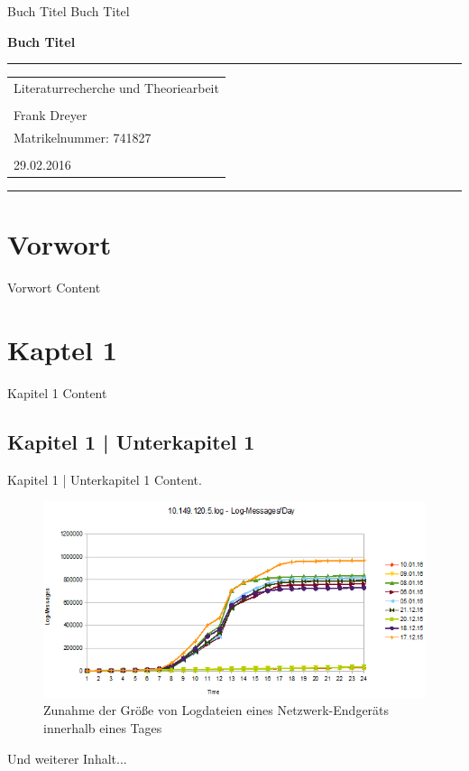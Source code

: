 \documentclass[deutsch]{lib/llncs/llncs}
\begin{document}
\markboth
{Buch Titel}
{Buch Titel}
\thispagestyle{empty}


\begin{flushleft}
\LARGE\bfseries Buch Titel


\end{flushleft}
\rule{\textwidth}{1pt}
\vspace{2pt}


\begin{flushright}
\Huge


\begin{tabular}{@{}l}
Literaturrecherche und Theoriearbeit\\\\
Frank Dreyer\\
Matrikelnummer: 741827\\\\
29.02.2016\\[6pt]
\end{tabular}


\end{flushright}
\rule{\textwidth}{1pt}
\vfill

\newpage
\tableofcontents
\newpage


\section{Vorwort}
Vorwort Content


\section{Kaptel 1}
Kapitel 1 Content


\subsection{Kapitel 1 | Unterkapitel 1}
Kapitel 1 | Unterkapitel 1 Content.\\
\begin{figure}
\centering
\includegraphics[scale=0.85]{img/DayAbsLogMsg.png}
\caption{Zunahme der Größe von Logdateien eines Netzwerk-Endgeräts innerhalb eines Tages}
\end{figure}
Und weiterer Inhalt...
\end{document}
